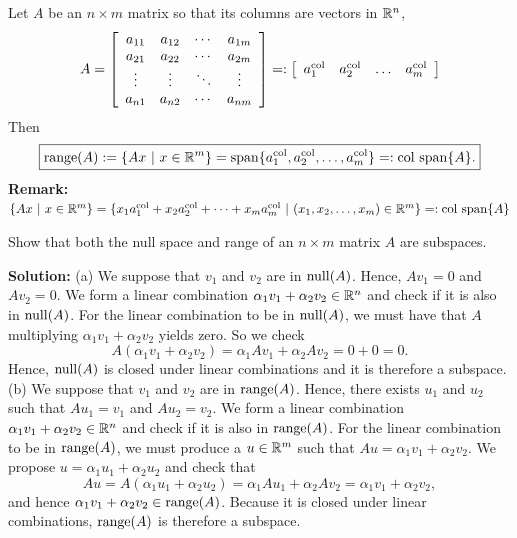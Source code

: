 \vspace*{.2cm}

\begin{tcolorbox}[sharp corners, colback=green!30, colframe=green!80!blue, title=\textbf{\Large Range of A Equals Column Span of A}]
Let $A$ be an $n \times m$ matrix so that its columns are vectors in $\mathbb R^n$,
$$A=\left[\begin{array}{cccc} a_{11}& a_{12}& \cdots & a_{1m} \\
 a_{21}& a_{22}& \cdots & a_{2m}  \\
 \vdots & \vdots&  \ddots & \vdots \\
 a_{n1}& a_{n2}& \cdots & a_{nm} 
 \end{array}\right] =: \left[\begin{array}{cccc} a^{\rm col}_1 & a^{\rm col}_2& \ldots & a^{\rm col}_m \end{array}\right]$$
 Then
 $$\boxed{\mathrm{range}(A):=\{ Ax ~ |~ x\in \mathbb R^m\} =\mathrm{span} \{ a^{\rm col}_1, a^{\rm col}_2, \ldots, a^{\rm col}_m  \}=:\mathrm{col~span} \{ A \}.} $$
 \vspace*{.2cm}
 \textbf{Remark:} $\{ Ax ~ |~ x\in \mathbb R^m\} = \{ x_1 a^{\rm col}_1 + x_2 a^{\rm col}_2 + \cdots + x_m a^{\rm col}_m ~ |~ (x_1, x_2, \ldots, x_m) \in \mathbb R^m\}=:\mathrm{col~span} \{ A \}$
\end{tcolorbox}



 \vspace*{0.5cm}
 
\begin{example}
\label{ex:NullSpaceAndRange}
Show that both the null space and range of an $n \times m$ matrix $A$ are subspaces. 
\end{example}

\textbf{Solution:} (a) We suppose that $v_1$ and $v_2$ are in $\mathrm{null}(A)$. Hence, $A v_1 =0$ and $A v_2=0.$ We form a linear combination $\alpha_1 v_1 + \alpha_2 v_2 \in \mathbb R^n$ and check if it is also in $\mathrm{null}(A)$. For the linear combination to be in $\mathrm{null}(A)$, we must have that $A$ multiplying $\alpha_1 v_1 + \alpha_2 v_2$ yields zero. So we check
 $$ A (\alpha_1 v_1 + \alpha_2 v_2) = \alpha_1 A v_1 + \alpha_2 A v_2= 0 + 0 = 0.$$
Hence, $\mathrm{null}(A)$ is closed under linear combinations and it is therefore a subspace.\\

(b)  We suppose that $v_1$ and $v_2$ are in $\mathrm{range}(A)$. Hence, there exists $u_1$ and $u_2$ such that $A u_1=v_1$ and $A u_2 = v_2.$ We form a linear combination $\alpha_1 v_1 + \alpha_2 v_2 \in \mathbb R^n$ and check if it is also in $\mathrm{range}(A)$. For the linear combination to be in $\mathrm{range}(A)$, we must produce a $u\in \mathbb R^m$ such that  $A u = \alpha_1 v_1 + \alpha_2 v_2$. We propose $u = \alpha_1 u_1 + \alpha_2 u_2 $ and check that
 $$A u =  A (\alpha_1 u_1 + \alpha_2 u_2) = \alpha_1 A u_1 + \alpha_2 A v_2=\alpha_1 v_1 + \alpha_2 v_2,$$
and hence  $\alpha_1 v_1 + \alpha_2 v_2 \in \mathrm{range}(A)$. Because it is closed under linear combinations, $\mathrm{range}(A)$ is therefore a subspace. \Qed






